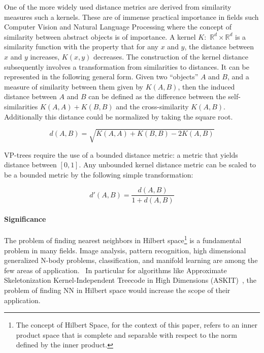 \documentclass[11pt]{article}
\begin{document}
One of the more widely used distance metrics are derived from similarity measures such a kernels. These are of immense practical importance in fields such Computer Vision and Natural Language Processing where the concept of similarity between abstract objects is of importance. A kernel $K:$ $\mathbb{R}^d \times \mathbb{R}^d$ is a similarity function with the property that for any $x$ and $y$, the distance between $x$ and $y$ increases, $K(x, y)$ decreases. The construction of the kernel distance subsequently involves a transformation from similarities to distances. It can be represented in the following general form. Given two “objects” $A$ and $B$, and a measure of similarity between them given by $K(A,B)$, then the induced distance between $A$ and $B$ can be defined as the difference between the self-similarities $K(A,A) + K(B,B)$ and the cross-similarity $K(A,B)$. Additionally this distance could be normalized by taking the square root.~\cite{Phillips10}

\begin{equation}
d(A,B) = \sqrt{K(A,A) + K(B,B) - 2K(A,B)}
\end{equation}

VP-trees require the use of a bounded distance metric: a metric that yields distance between $[0,1]$. Any unbounded kernel distance metric can be scaled to be a bounded metric by the following simple transformation:~\cite{Yianilos93}

\begin{equation}
d'(A,B) = \frac{d(A,B)}{1 + d(A,B)}
\end{equation}

\paragraph*{Significance} The problem of finding nearest neighbors in Hilbert space\footnote{The concept of Hilbert Space, for the context of this paper, refers to  an inner product space that is complete and separable with respect to the norm defined by the inner product.} is a fundamental problem in many fields. Image analysis, pattern recognition, high dimensional generalized N-body problems, classification, and manifold learning are among the few areas of application.~\cite{Moon11} In particular for algorithms like Approximate Skeletonization Kernel-Independent Treecode in High Dimensions (ASKIT)~\cite{MarchXB14}, the problem of finding NN in Hilbert space would increase the scope of their application.
\end{document}
